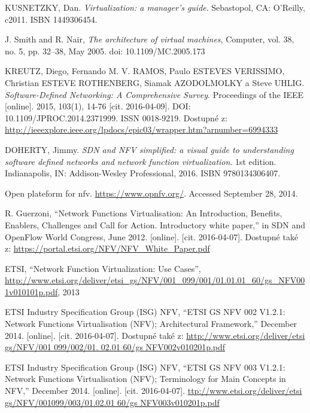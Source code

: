 \begin{thebibliography}{10}
KUSNETZKY, Dan. \emph{Virtualization: a manager's guide}. Sebastopol, CA: O'Reilly, c2011. ISBN 1449306454.

J. Smith and R. Nair, \emph{The architecture of virtual machines}, Computer, vol. 38, no. 5, pp. 32–38, May 2005. doi: 10.1109/MC.2005.173

KREUTZ, Diego, Fernando M. V. RAMOS, Paulo ESTEVES VERISSIMO, Christian ESTEVE ROTHENBERG, Siamak AZODOLMOLKY a Steve UHLIG. \emph{Software-Defined Networking: A Comprehensive Survey}. Proceedings of the IEEE [online]. 2015, 103(1), 14-76 [cit. 2016-04-09]. DOI: 10.1109/JPROC.2014.2371999. ISSN 0018-9219. Dostupné z: \url{http://ieeexplore.ieee.org/lpdocs/epic03/wrapper.htm?arnumber=6994333}

 DOHERTY, Jimmy. \emph{SDN and NFV simplified: a visual guide to understanding software defined networks and network function virtualization}. 1st edition. Indianapolis, IN: Addison-Wesley Professional, 2016. ISBN 9780134306407.


Open plateform for nfv. \url{https://www.opnfv.org/}.  Accessed September 28, 2014.

R. Guerzoni, “Network Functions Virtualisation: An Introduction, Benefits, Enablers, Challenges and Call for Action. Introductory white paper,” in SDN and OpenFlow World Congress, June 2012. [online]. [cit. 2016-04-07]. Dostupné také z: \url{https://portal.etsi.org/NFV/NFV_White_Paper.pdf}


ETSI, “Network Function Virtualization: Use Cases”, \url{http://www.etsi.org/deliver/etsi_gs/NFV/001_099/001/01.01.01_60/gs_NFV001v010101p.pdf}, 2013

ETSI Industry Specification Group (ISG) NFV, “ETSI GS NFV 002 V1.2.1: Network Functions Virtualisation (NFV); Architectural Framework,” December 2014. [online]. [cit. 2016-04-07]. Dostupné také z: \url{http://www.etsi.org/deliver/etsi gs/NFV/001 099/002/01. 02.01 60/gs NFV002v010201p.pdf} 

ETSI Industry Specification Group (ISG) NFV, “ETSI GS NFV 003 V1.2.1: Network Functions Virtualisation (NFV); Terminology for Main Concepts in NFV,” December 2014. [online]. [cit. 2016-04-07]. \url{ttp://www.etsi.org/deliver/etsi gs/NFV/001099/003/01.02.01 60/gs NFV003v010201p.pdf}


\end{thebibliography}

